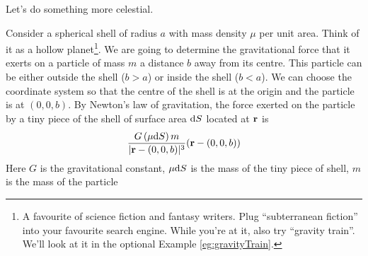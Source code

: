 Let's do something more celestial.
\begin{eg}\label{eg:surfaceIntegralB}
Consider a spherical shell of radius $a$ with mass density $\mu$ per unit
area. Think of it as a hollow planet\footnote{A favourite of science 
fiction and fantasy writers. Plug ``subterranean fiction'' into your favourite
search engine. While you're at it, also try ``gravity train''. We'll look at it in the optional Example \ref{eg:gravityTrain}.}.
We are going to determine the gravitational force that it exerts on a particle
of mass $m$ a distance $b$ away from its centre. This particle can be either
outside the shell ($b>a$) or inside the shell ($b<a$).
We can choose the coordinate system so that the centre of the shell is at the origin and the particle is
at $(0,0,b)$. By Newton's law of gravitation, the force exerted on the 
particle by a tiny piece of the shell of surface area $\mathrm{d}S$ located at $\mathbf{r}$ is
\begin{equation*}
\frac{G\,(\mu\mathrm{d}S)\,m}{|\mathbf{r}-(0,0,b)|^3}(\mathbf{r}-(0,0,b))
\end{equation*} 
Here $G$ is the gravitational constant, $\mu\mathrm{d}S$ is the mass of the tiny
piece of shell, $m$ is the mass of the particle 
\end{eg}
